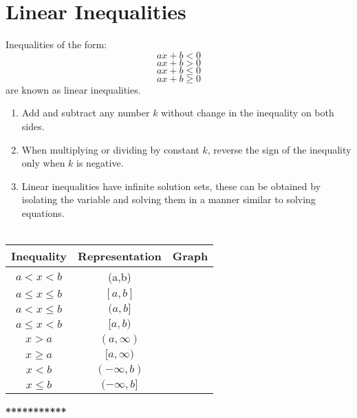 \section{Linear Inequalities}

\setlength{\baselineskip}{1pt}
Inequalities of the form: %
\vspace{\baselineskip}
\[ax + b < 0\] %
\vspace{\baselineskip}
 \[ax + b > 0\] %
\vspace{\baselineskip} 
\[ax + b \leq 0\] %
\vspace{\baselineskip} 
\[ax + b \geq 0\] %
\vspace{\baselineskip} 
are known as linear inequalities.
\vspace{\baselineskip}
 
\begin{enumerate}
\item Add and subtract any number $k$ without change in the inequality on both sides.
\item When multiplying or dividing by constant $k$, reverse the sign of the inequality only when $k$ is negative.
\item Linear inequalities have infinite solution sets, these can be obtained by isolating the variable and solving them in a manner similar to solving equations.\\ \\
\end{enumerate}

\begin{center}
\begin{tabular}{|c|c|>{\centering\arraybackslash}p{}|}
\hline 
Inequality & Representation & Graph \\ 
\hline 
$ a < x < b$ & (a,b) &  \\ 
\hline 
$ a \leq x \leq b $ & $ [a,b] $ &  \\ 
\hline 
$ a < x \leq b $ & $ (a,b] $ &  \\ 
\hline 
$ a \leq x < b $ & $ [a,b) $ &  \\ 
\hline 
$ x > a $ & $ (a,\infty) $ &  \\ 
\hline 
$ x \geq a $ & $ [a,\infty) $ &  \\ 
\hline 
$ x < b $ & $ (-\infty,b) $ &  \\ 
\hline 
$ x \leq b $ & $ (-\infty,b] $ &  \\ 
\hline 
\end{tabular} 
\end{center}

\vspace{1mm}
\begin{center}
\textbf{***********}
\end{center}